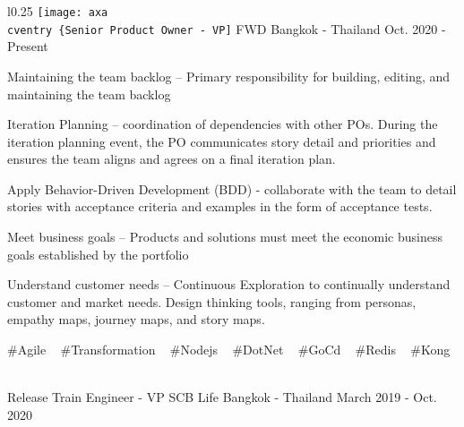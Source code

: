

\begin{cventries}



\begin{wrapfigure}{l}{0.25\textwidth}
\centering
    \texttt{[image: axa
  \\cventry
    \{Senior Product Owner - VP]} %
    {FWD} %
    {Bangkok - Thailand} %
    {Oct. 2020 - Present} %
    {
      \begin{cvitems} %
        \item {Maintaining the team backlog – Primary responsibility for building, editing, and maintaining the team backlog}
        \item {Iteration Planning – coordination of dependencies with other POs. During the iteration planning event, the PO communicates story detail and priorities and ensures the team aligns and agrees on a final iteration plan.}
        \item {Apply Behavior-Driven Development (BDD) - collaborate with the team to detail stories with acceptance criteria and examples in the form of acceptance tests.}
        \item {Meet business goals – Products and solutions must meet the economic business goals established by the portfolio}
        \item {Understand customer needs – Continuous Exploration to continually understand customer and market needs. Design thinking tools, ranging from personas, empathy maps, journey maps, and story maps.}
      \end{cvitems}
    }
    {
      \#Agile ~
      \#Transformation ~
      \#Nodejs ~
      \#DotNet ~
      \#GoCd ~
      \#Redis ~
      \#Kong ~
    }
\end{wrapfigure}
  \cventry
    {Release Train Engineer - VP} %
    {SCB Life} %
    {Bangkok - Thailand} %
    {March 2019 - Oct. 2020} %
    {
      \begin{cvitems} %

\end{cvitems}}
\end{cventries}
